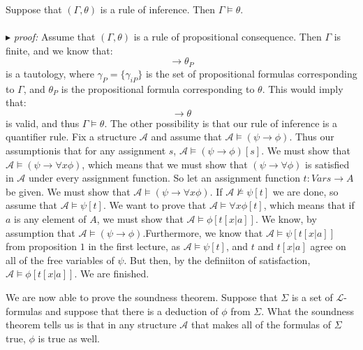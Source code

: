 \documentclass[9pt,a4paper]{article}
\newcounter{theo}
\newcommand{\curveL}{\mathcal{L}}
\newcommand{\curveA}{\mathcal{A}}
\newcommand{\proof}{\ \\ \ \\ $\blacktriangleright$ \textit{proof: }}
\begin{document}
        \begin{theorem}
            Suppose that $(\Gamma, \theta)$ is a rule of inference. Then $\Gamma\vDash \theta$. 
            \proof Assume that $(\Gamma, \theta)$ is a rule of propositional consequence. Then $\Gamma$ is finite, and we know that:
            \begin{equation}
                [\gamma_{1P}\land\dots\land\gamma_{nP}]\rightarrow \theta_P
            \end{equation}
            is a tautology, where $\gamma_P = \{\gamma_{iP}\}$ is the set of propositional formulas corresponding to $\Gamma$, and $\theta_P$ is the propositional formula corresponding to $\theta$. This would imply that:
            \begin{equation}
                [\gamma_1\land\dots\land\gamma_n]\rightarrow \theta
            \end{equation}
            is valid, and thus $\Gamma\vDash\theta$. The other possibility is that our rule of inference is a quantifier rule. Fix a structure $\curveA$ and assume that $\curveA\vDash(\psi\rightarrow\phi)$. Thus our assumptionis that for any assignment $s$, $\curveA\vDash(\psi\rightarrow\phi)[s]$. We must show that $\curveA\vDash(\psi\rightarrow\forall x\phi)$, which means that we must show that $(\psi\rightarrow\forall \phi)$ is satisfied in $\curveA$ under every assignment function. So let an assignment function $t:Vars\rightarrow A$ be given. We must show that $\curveA\vDash(\psi\rightarrow\forall x\phi)$. If $\curveA\not \vDash \psi[t]$ we are done, so assume that $\curveA\vDash\psi[t]$. We want to prove that $\curveA\vDash\forall x\phi[t]$, which means that if $a$ is any element of $A$, we must show that $\curveA\vDash\phi[t[x|a]]$. We know, by assumption that $\curveA\vDash(\psi\rightarrow\phi)$.Furthermore, we know that $\curveA\vDash\psi[t[x|a]]$ from proposition $1$ in the first lecture, as $\curveA\vDash\psi[t]$, and $t$ and $t[x|a]$ agree on all of the free variables of $\psi$. But then, by the definiiton of satisfaction, $\curveA\vDash\phi[t[x|a]]$. We are finished.
        \end{theorem}
        We are now able to prove the soundness theorem. Suppose that $\Sigma$ is a set of $\curveL$-formulas and suppose that there is a deduction of $\phi$ from $\Sigma$. What the soundness theorem tells us is that in any structure $\curveA$ that makes all of the formulas of $\Sigma$ true, $\phi$ is true as well.
\end{document}
